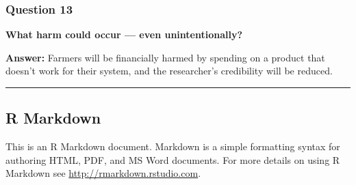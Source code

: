\documentclass[
]{article}
\begin{document}
\subsubsection{Question 13}\label{question-13}

\textbf{What harm could occur --- even unintentionally?}

\textbf{Answer:} Farmers will be financially harmed by spending on a
product that doesn't work for their system, and the researcher's
credibility will be reduced.

\begin{center}\rule{0.5\linewidth}{0.5pt}\end{center}

\subsection{R Markdown}\label{r-markdown}

This is an R Markdown document. Markdown is a simple formatting syntax
for authoring HTML, PDF, and MS Word documents. For more details on
using R Markdown see \url{http://rmarkdown.rstudio.com}.
\end{document}
